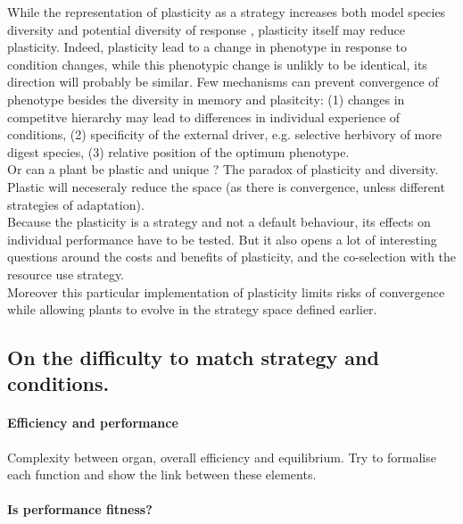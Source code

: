While the representation of plasticity as a strategy increases both model species diversity and potential  diversity of response \cite{ ryser_consequences_2000, kichenin_contrasting_2013}, plasticity itself may reduce plasticity. Indeed, plasticity lead to a change in phenotype in response to condition changes, while this phenotypic change is unlikly to be identical, its direction will probably be similar. Few mechanisms can prevent convergence of phenotype besides the diversity in memory and plasitcity: (1) changes in competitve hierarchy may lead to differences in individual experience of conditions, (2) specificity of the external driver, e.g. selective herbivory of more digest species, (3) relative position of the optimum phenotype.\\



Or can a plant be plastic and unique ? The paradox of plasticity and diversity.\\
Plastic will neceseraly reduce the space (as there is convergence, unless different strategies of adaptation).\\

 Because the plasticity is a strategy and not a default behaviour, its effects on individual performance have to be tested. But it also opens a lot of interesting questions around the costs and benefits of plasticity, and the co-selection with the resource use strategy.\\
Moreover this particular implementation of plasticity limits risks of convergence while allowing plants to evolve in the strategy space defined earlier.

\subsection{On the difficulty to match strategy and conditions.}\label{subsection:match}

\paragraph{Efficiency and performance}

Complexity between organ, overall efficiency and equilibrium. Try to formalise each function and show the link between these elements.

\paragraph{Is performance fitness?}

